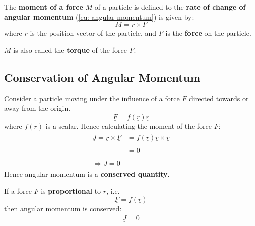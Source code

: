 \begin{definition}

	The {\bf moment of a force} $\underline{M}$  of a particle is defined to the {\bf rate of change of angular momentum} (\ref{eq: angular-momentum}) is given by:
	\begin{equation}
		\label{eq: moment-of-a-force}
		\underline{M} = \underline{r} \times \underline{F}
	\end{equation}
	where $\underline{r}$ is the position vector of the particle, and $\underline{F}$ is the {\bf force} on the particle.
\end{definition}

\begin{note}
	$\underline{M}$ is also called the {\bf torque} of the force $\underline{F}$.
\end{note}

\subsection{Conservation of Angular Momentum}
Consider a particle moving under the influence of a force $\underline{F}$ directed towards or away from the origin.
$$\underline{F} = f(\underline{r})\underline{r} $$
where $f(\underline{r})$ is a scalar. Hence calculating the moment of the force $\underline{F}$:
$$\begin{aligned} \underline{\dot{J}} = \underline{r} \times \underline{F} & = f(\underline{r})\underline{r} \times \underline{r} \\ \\
                                                                         & = 0                                                  \\ \\
                \Rightarrow \underline{\dot{J}} = 0\end{aligned}$$
Hence angular momentum is a {\bf conserved quantity}.

\clearpage
\begin{definition}
	If a force $\underline{F}$ is {\bf proportional} to $\underline{r}$, i.e.
	$$\underline{F}=f(\underline{r})$$
	then angular momentum is conserved:
	$$\underline{\dot{J}} = 0$$

\end{definition}
